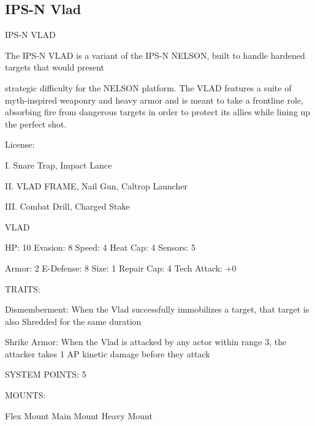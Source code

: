\subsection{IPS-N Vlad}
                                                                 
                                                     IPS-N VLAD  

The IPS-N VLAD is a variant of the IPS-N NELSON, built to handle hardened targets that would present  

strategic difficulty for the NELSON platform. The VLAD features a suite of myth-inspired weaponry and  
heavy armor and is meant to take a frontline role, absorbing fire from dangerous targets in order to protect  
its allies while lining up the perfect shot.   

                                                                                                                          


                                                      License:
 
I. Snare Trap, Impact Lance
 
II. VLAD FRAME, Nail Gun, Caltrop Launcher
 
III. Combat Drill, Charged Stake
 

                                                       VLAD 

  HP: 10          Evasion: 8                              Speed: 4            Heat Cap: 4         Sensors: 5 

  Armor: 2        E-Defense: 8                            Size: 1             Repair Cap: 4       Tech Attack:  
                                                                                                  +0 

                                                      TRAITS: 

  Dismemberment: When the Vlad successfully immobilizes a target, that target is also Shredded for the  
  same duration
 
  Shrike Armor: When the Vlad is attacked by any actor within range 3, the attacker takes 1 AP kinetic  
  damage before they attack 

                                                SYSTEM POINTS: 5 

                                                      MOUNTS: 

  Flex Mount                          Main Mount                               Heavy Mount 


